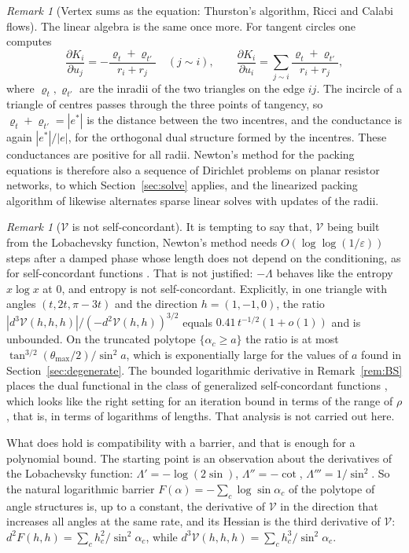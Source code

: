 \documentclass[11pt]{amsart}
\theoremstyle{definition}
\theoremstyle{remark}
\newtheorem{remark}[theorem]{Remark}
\newcommand{\eps}{\varepsilon}
\begin{document}
\begin{remark}[Vertex sums as the equation: Thurston's algorithm, Ricci and Calabi flows]
The linear algebra is the same once more. For tangent circles one computes
\[
\frac{\partial K_i}{\partial u_j}=-\frac{\varrho_t+\varrho_{t'}}{r_i+r_j}\quad(j\sim i),\qquad \frac{\partial K_i}{\partial u_i}=\sum_{j\sim i}\frac{\varrho_t+\varrho_{t'}}{r_i+r_j},
\]
where $\varrho_t,\varrho_{t'}$ are the inradii of the two triangles on the edge $ij$. The incircle of a triangle of centres passes through the three points of tangency, so $\varrho_t+\varrho_{t'}=|e^*|$ is the distance between the two incentres, and the conductance is again $|e^*|/|e|$, for the orthogonal dual structure formed by the incentres.
These conductances are positive for all radii. Newton's method for the packing equations is therefore also a sequence of Dirichlet problems on planar resistor networks, to which Section~\ref{sec:solve} applies, and the linearized packing algorithm of \cite{OSC17} likewise alternates sparse linear solves with updates of the radii.
\end{remark}

\begin{remark}[$\mathcal V$ is not self-concordant]\label{rem:sc}
It is tempting to say that, $\mathcal V$ being built from the Lobachevsky function, Newton's method needs $O(\log\log(1/\eps))$ steps after a damped phase whose length does not depend on the conditioning, as for self-concordant functions \cite{NN94}. That is not justified:
$-\Lambda$ behaves like the entropy $x\log x$ at $0$, and entropy is not self-concordant. Explicitly, in one triangle with angles $(t,2t,\pi-3t)$ and the direction $h=(1,-1,0)$, the ratio $|d^3\mathcal V(h,h,h)|/(-d^2\mathcal V(h,h))^{3/2}$ equals $0.41\,t^{-1/2}(1+o(1))$ and is unbounded.
On the truncated polytope $\{\alpha_c\ge a\}$ the ratio is at most $\tan^{3/2}(\theta_{\max}/2)/\sin^2a$, which is exponentially large for the values of $a$ found in Section~\ref{sec:degenerate}. The bounded logarithmic derivative in Remark~\ref{rem:BS} places the dual functional in the class of generalized
self-concordant functions \cite{Bach10}, which looks like the right setting for an iteration bound in terms of the range of $\rho$, that is, in terms of logarithms of lengths. That analysis is not carried out here.
\end{remark}
What does hold is compatibility with a barrier, and that is enough for a polynomial bound. The starting point is an observation about the derivatives of the Lobachevsky function: $\Lambda'=-\log(2\sin)$, $\Lambda''=-\cot$, $\Lambda'''=1/\sin^2$.
So the natural logarithmic barrier $F(\alpha)=-\sum_c\log\sin\alpha_c$ of the polytope of angle structures is, up to a constant, the derivative of $\mathcal V$ in the direction that increases all angles at the same rate, and its Hessian is the third derivative of $\mathcal V$: $d^2F(h,h)=\sum_ch_c^2/\sin^2\alpha_c$, while $d^3\mathcal V(h,h,h)=\sum_ch_c^3/\sin^2\alpha_c$.
\end{document}
